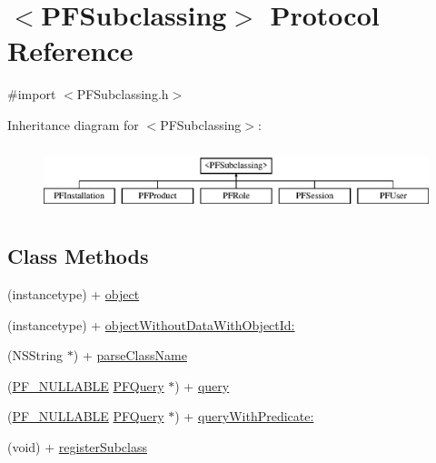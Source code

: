 \hypertarget{protocol_p_f_subclassing-p}{}\section{$<$P\+F\+Subclassing$>$ Protocol Reference}
\label{protocol_p_f_subclassing-p}


{\ttfamily \#import $<$P\+F\+Subclassing.\+h$>$}

Inheritance diagram for $<$P\+F\+Subclassing$>$\+:\begin{figure}[H]
\begin{center}
\leavevmode
\includegraphics[height=1.898305cm]{protocol_p_f_subclassing-p}
\end{center}
\end{figure}
\subsection*{Class Methods}
\begin{DoxyCompactItemize}
\item 
(instancetype) + \hyperlink{protocol_p_f_subclassing-p_a7f17fb9d35539e057890ce6b66b22293}{object}
\item 
(instancetype) + \hyperlink{protocol_p_f_subclassing-p_af3992a1edcf12e055227eca7850e57b9}{object\+Without\+Data\+With\+Object\+Id\+:}
\item 
(N\+S\+String $\ast$) + \hyperlink{protocol_p_f_subclassing-p_ac668f618e2de4306a129ca75d2585222}{parse\+Class\+Name}
\item 
(\hyperlink{_p_f_nullability_8h_a528d97a96c5fb279a45c378f5657fca2}{P\+F\+\_\+\+N\+U\+L\+L\+A\+B\+L\+E} \hyperlink{interface_p_f_query}{P\+F\+Query} $\ast$) + \hyperlink{protocol_p_f_subclassing-p_ac663a8e544652a5303b8e0a7d704c3d9}{query}
\item 
(\hyperlink{_p_f_nullability_8h_a528d97a96c5fb279a45c378f5657fca2}{P\+F\+\_\+\+N\+U\+L\+L\+A\+B\+L\+E} \hyperlink{interface_p_f_query}{P\+F\+Query} $\ast$) + \hyperlink{protocol_p_f_subclassing-p_a58ff17c2706d2926c0158d196cd418a3}{query\+With\+Predicate\+:}
\item 
(void) + \hyperlink{protocol_p_f_subclassing-p_a7bcbfc4efd502aa831aee7dee48eabb1}{register\+Subclass}
\end{DoxyCompactItemize}


